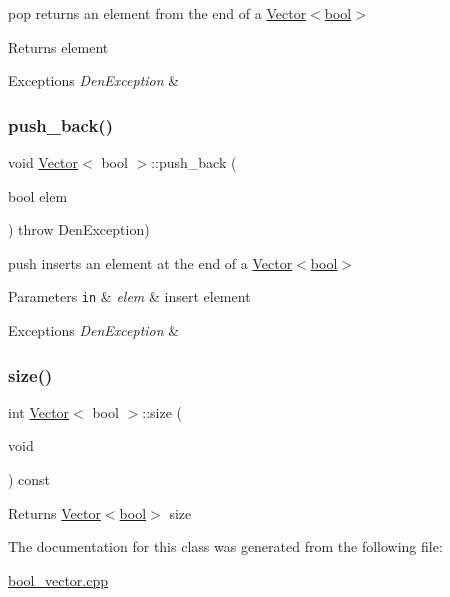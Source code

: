 pop  returns an element from the end of a \hyperlink{classVector_3_01bool_01_4}{Vector$<$bool$>$} 

\begin{DoxyReturn}{Returns}
element 
\end{DoxyReturn}

\begin{DoxyExceptions}{Exceptions}
{\em Den\+Exception} & \\
\hline
\end{DoxyExceptions}
\mbox{\label{classVector_3_01bool_01_4_a8ea33e431ec6cd90840a392f84aefdae}} 
\subsubsection{\texorpdfstring{push\+\_\+back()}{push\_back()}}
{\footnotesize\ttfamily void \hyperlink{classVector}{Vector}$<$ bool $>$\+::push\+\_\+back (\begin{DoxyParamCaption}\item[{bool}]{elem }\end{DoxyParamCaption}) throw  Den\+Exception) }



push  inserts an element at the end of a \hyperlink{classVector_3_01bool_01_4}{Vector$<$bool$>$} 


\begin{DoxyParams}[1]{Parameters}
\mbox{\tt in}  & {\em elem} & insert element \\
\hline
\end{DoxyParams}

\begin{DoxyExceptions}{Exceptions}
{\em Den\+Exception} & \\
\hline
\end{DoxyExceptions}
\mbox{\label{classVector_3_01bool_01_4_acb9a245334b171ea1ad0d9bda20da76e}} 
\subsubsection{\texorpdfstring{size()}{size()}}
{\footnotesize\ttfamily int \hyperlink{classVector}{Vector}$<$ bool $>$\+::size (\begin{DoxyParamCaption}\item[{void}]{ }\end{DoxyParamCaption}) const}

\begin{DoxyReturn}{Returns}
\hyperlink{classVector_3_01bool_01_4}{Vector$<$bool$>$} size 
\end{DoxyReturn}


The documentation for this class was generated from the following file\+:\begin{DoxyCompactItemize}
\item 
\hyperlink{bool__vector_8cpp}{bool\+\_\+vector.\+cpp}\end{DoxyCompactItemize}
